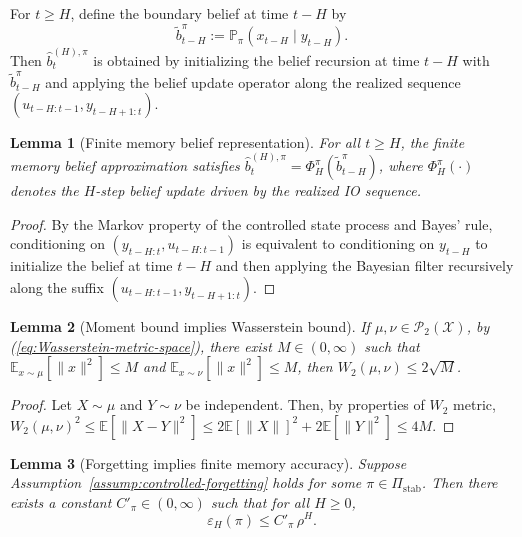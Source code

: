 \documentclass[letterpaper, 10 pt, conference]{ieeeconf}
\newtheorem{lemma}{Lemma}
\begin{document}
For $t\ge H$, define the boundary belief at time $t-H$ by
\begin{equation}
\tilde b_{t-H}^\pi := \mathbb{P}_\pi(x_{t-H}\mid y_{t-H}).    
\end{equation}
Then $\hat b_t^{(H),\pi}$ is obtained by initializing the belief recursion at time $t-H$ with $\tilde b_{t-H}^\pi$ and applying the belief update operator along the realized sequence $(u_{t-H:t-1},y_{t-H+1:t})$.

\begin{lemma}[Finite memory belief representation]
\label{lem:window-representation}
For all $t\ge H$, the finite memory belief approximation satisfies
$\hat b_t^{(H),\pi} = \Phi_H^\pi(\tilde b_{t-H}^\pi)$,
where $\Phi_H^\pi(\cdot)$ denotes the $H$-step belief update driven by the realized IO sequence.
\end{lemma}
\begin{proof}
By the Markov property of the controlled state process and Bayes' rule, conditioning on $(y_{t-H:t},u_{t-H:t-1})$ is equivalent to conditioning on $y_{t-H}$ to initialize the belief at time $t-H$ and then applying the Bayesian filter recursively along the suffix $(u_{t-H:t-1},y_{t-H+1:t})$.
\end{proof}

\begin{lemma}[Moment bound implies Wasserstein bound]
\label{lem:w2-moment}
If $\mu,\nu\in\mathcal{P}_2(\mathcal{X})$, by (\ref{eq:Wasserstein-metric-space}), there exist $M\in(0,\infty)$ such that $\mathbb{E}_{x\sim\mu}[\|x\|^2] \le M$ and $\mathbb{E}_{x\sim\nu}[\|x\|^2] \le M$, then $W_2(\mu,\nu)\le 2\sqrt{M}$.
\end{lemma}
\begin{proof}
Let $X\sim\mu$ and $Y\sim\nu$ be independent.
Then, by properties of $W_2$ metric, $W_2(\mu,\nu)^2 \le \mathbb{E}[\|X-Y\|^2] \le 2\mathbb{E}[\|X\|]^2+2\mathbb{E}[\|Y\|^2] \le 4M$.
\end{proof}

\begin{lemma}[Forgetting implies finite memory accuracy]
\label{lem:forgetting-implies-eps}
Suppose Assumption~\ref{assump:controlled-forgetting} holds for some $\pi\in\Pi_{\mathrm{stab}}$.
Then there exists a constant $C'_\pi\in(0,\infty)$ such that for all $H\ge 0$,
\begin{equation}
\varepsilon_H(\pi)\le C'_\pi\,\rho^H.
\end{equation}
\end{lemma}
\end{document}
